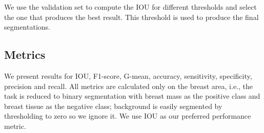We use the validation set to compute the IOU for different thresholds and select the one that produces the best result. This threshold is used to produce the final segmentations.


\subsection{Metrics}
We present results for IOU, F1-score, G-mean, accuracy, sensitivity, specificity, precision and recall.
All metrics are calculated only on the breast area, i.e., the task is reduced to binary segmentation with breast mass as the positive class and breast tissue as the negative class; background is easily segmented by thresholding to zero so we ignore it.
We use IOU as our preferred performance metric.

